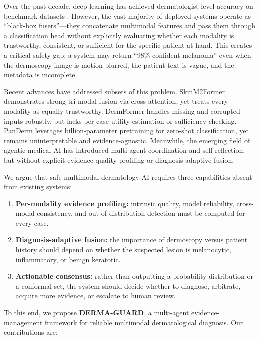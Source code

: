 \documentclass[conference]{IEEEtran}
\begin{document}
Over the past decade, deep learning has achieved dermatologist-level accuracy on benchmark datasets \cite{esteva2017}. However, the vast majority of deployed systems operate as ``black-box fusers''—they concatenate multimodal features and pass them through a classification head without explicitly evaluating whether each modality is trustworthy, consistent, or sufficient for the specific patient at hand. This creates a critical safety gap: a system may return ``98\% confident melanoma'' even when the dermoscopy image is motion-blurred, the patient text is vague, and the metadata is incomplete.

Recent advances have addressed subsets of this problem. SkinM2Former \cite{zhang2025} demonstrates strong tri-modal fusion via cross-attention, yet treats every modality as equally trustworthy. DermFormer \cite{cockayne2025} handles missing and corrupted inputs robustly, but lacks per-case utility estimation or sufficiency checking. PanDerm \cite{yan2025} leverages billion-parameter pretraining for zero-shot classification, yet remains uninterpretable and evidence-agnostic. Meanwhile, the emerging field of agentic medical AI \cite{kgdagents2026, skingptx2026, dermagent2026} has introduced multi-agent coordination and self-reflection, but without explicit evidence-quality profiling or diagnosis-adaptive fusion.

We argue that safe multimodal dermatology AI requires three capabilities absent from existing systems:
\begin{enumerate}
    \item \textbf{Per-modality evidence profiling:} intrinsic quality, model reliability, cross-modal consistency, and out-of-distribution detection must be computed for every case.
    \item \textbf{Diagnosis-adaptive fusion:} the importance of dermoscopy versus patient history should depend on whether the suspected lesion is melanocytic, inflammatory, or benign keratotic.
    \item \textbf{Actionable consensus:} rather than outputting a probability distribution or a conformal set, the system should decide whether to diagnose, arbitrate, acquire more evidence, or escalate to human review.
\end{enumerate}

To this end, we propose \textbf{DERMA-GUARD}, a multi-agent evidence-management framework for reliable multimodal dermatological diagnosis. Our contributions are:
\end{document}
